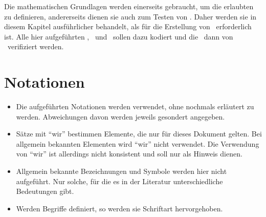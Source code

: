 Die mathematischen Grundlagen werden einerseits gebraucht, um die erlaubten \Beweisschritte{} zu definieren, andererseits dienen sie auch zum Testen von \ASBA.
Daher werden sie in diesem Kapitel ausführlicher behandelt, als für die Erstellung von \ASBA\ erforderlich ist.
Alle hier aufgeführten \Axiome, \Saetze\ und \Beweise\ sollen dazu kodiert und die \Beweise\ dann von \ASBA\ verifiziert werden.

\section{Notationen}%
\label{sec:Notationen}

\begin{itemize}
	\item Die  aufgeführten Notationen werden  verwendet, ohne nochmals erläutert zu werden. Abweichungen davon werden jeweils gesondert angegeben.
	\item Sätze mit \enquote{wir} bestimmen Elemente, die nur für dieses Dokument gelten.
	Bei allgemein bekannten Elementen wird \enquote{wir} nicht verwendet.
	Die Verwendung von \enquote{wir} ist allerdings nicht konsistent und soll nur als Hinweis dienen.
	\item Allgemein bekannte Bezeichnungen und Symbole werden hier nicht aufgeführt.
	Nur solche, für die es in der Literatur unterschiedliche Bedeutungen gibt.
	\item Werden Begriffe definiert, so werden sie  Schriftart hervorgehoben.
\end{itemize}
